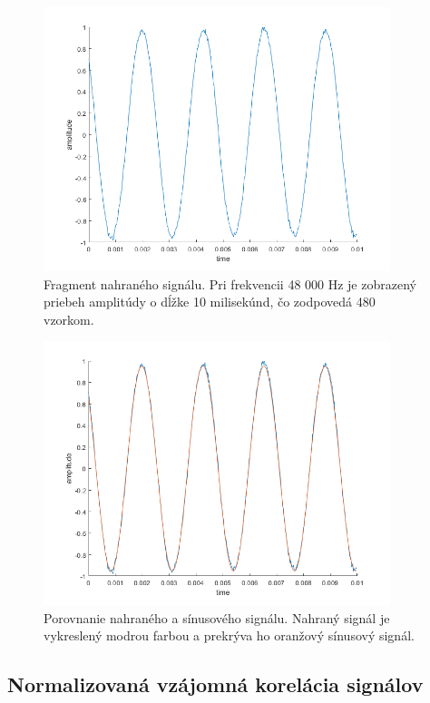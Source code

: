 \begin{figure}[!hbt]
	\centering
	\includegraphics[width=0.9\textwidth]{obrazky-figures/matlab_recorded.png}
	\caption{Fragment nahraného signálu. Pri frekvencii 48 000 Hz je zobrazený priebeh amplitúdy o dĺžke 10 milisekúnd, čo zodpovedá 480 vzorkom.}
	\label{matlab_recorded}
\end{figure}

\begin{figure}[!hbt]
	\centering
	\includegraphics[width=0.9\textwidth]{obrazky-figures/matlab_comparison.png}
	\caption{Porovnanie nahraného a sínusového signálu. Nahraný signál je vykreslený modrou farbou a prekrýva ho oranžový sínusový signál.}
	\label{matlab_comparison}
\end{figure}


\FloatBarrier
\subsection*{Normalizovaná vzájomná korelácia signálov}

